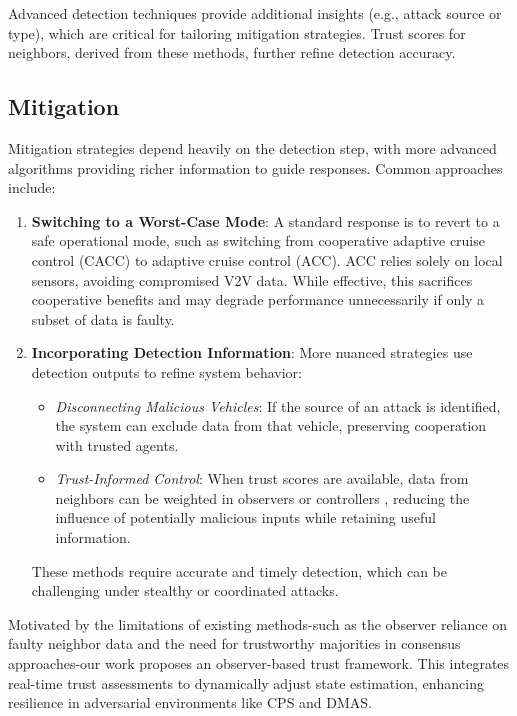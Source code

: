 \documentclass[letterpaper, 10pt, conference]{ieeeconf}  %
\begin{document}
Advanced detection techniques provide additional insights (e.g., attack source or type), which are critical for tailoring mitigation strategies. Trust scores for neighbors, derived from these methods, further refine detection accuracy.

\subsection*{Mitigation}
Mitigation strategies depend heavily on the detection step, with more advanced algorithms providing richer information to guide responses. Common approaches include:

\begin{enumerate}
    \item \textbf{Switching to a Worst-Case Mode}: 
    A standard response is to revert to a safe operational mode, such as switching from cooperative adaptive cruise control (CACC) to adaptive cruise control (ACC). ACC relies solely on local sensors, avoiding compromised V2V data. While effective, this sacrifices cooperative benefits and may degrade performance unnecessarily if only a subset of data is faulty.

    \item \textbf{Incorporating Detection Information}: 
    More nuanced strategies use detection outputs to refine system behavior:
    \begin{itemize}
        \item \textit{Disconnecting Malicious Vehicles}: If the source of an attack is identified, the system can exclude data from that vehicle, preserving cooperation with trusted agents.
        \item \textit{Trust-Informed Control}: When trust scores are available, data from neighbors can be weighted in observers or controllers \cite{self-belive , Enhancing_control_trust} , reducing the influence of potentially malicious inputs while retaining useful information.
    \end{itemize}
    These methods require accurate and timely detection, which can be challenging under stealthy or coordinated attacks.
\end{enumerate}

Motivated by the limitations of existing methods-such as the observer reliance on faulty neighbor data and the need for trustworthy majorities in consensus approaches-our work proposes an observer-based trust framework. This integrates real-time trust assessments to dynamically adjust state estimation, enhancing resilience in adversarial environments like CPS and DMAS.
\end{document}
